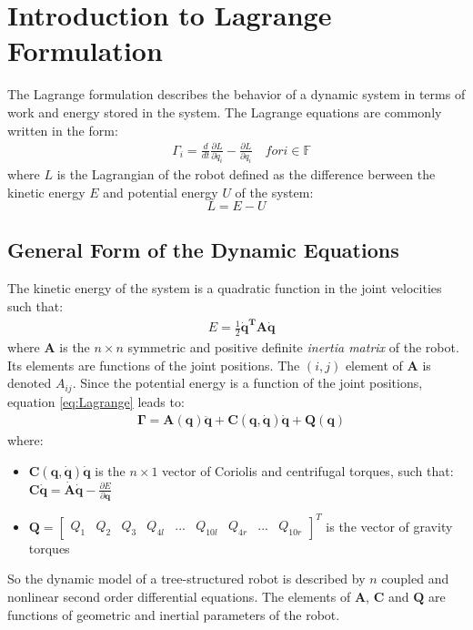 \documentclass[a4paper,10pt]{article}
\begin{document}
\section{Introduction to Lagrange Formulation}
The Lagrange formulation describes the behavior of a dynamic system in terms of work and energy stored in the
system. The Lagrange equations are commonly written in the form:
\begin{align}
 &\Gamma_i = \frac{d}{dt}\frac{\partial L}{\partial \dot{q}_i}-\frac{\partial L}{\partial q_i} \quad for i \in \mathbb{F} \label{eq:Lagrange}
\end{align} where $L$ is the Lagrangian of the robot defined as the difference berween the kinetic energy $E$ and potential 
energy $U$ of the system:
\[
 L = E-U
\]
\subsection{General Form of the Dynamic Equations}
The kinetic energy of the system is a quadratic function in the joint velocities such that:
\begin{align}
 &E = \frac{1}{2}\mathbf{\dot{q}^TA\dot{q}}
\end{align} where $\mathbf{A}$ is the $n\times n$ symmetric and positive definite \textit{inertia matrix} of the robot.
Its elements are functions of the joint positions. The $(i,j)$ element of $\mathbf{A}$ is denoted $A_{ij}$. Since the 
potential energy is a function of the joint positions, equation \ref{eq:Lagrange} leads to:
\begin{align}
 &\mathbf{\Gamma=A(q)\ddot{q}+C(q,\dot{q})\dot{q}+Q(q)}
\end{align} where:
\begin{itemize}
 \item $\mathbf{C(q,\dot{q})\dot{q}}$ is the $n\times 1$ vector of Coriolis and centrifugal torques, such that: 
 $\mathbf{C\dot{q} = \dot{A}\dot{q}}-\frac{\partial E}{\partial \mathbf{q}}$
 \item $\mathbf{Q} = \left[\begin{matrix} Q_1 & Q_2 & Q_3 & Q_{4l} & ... & Q_{10l} & Q_{4r} & ... & Q_{10r} \end{matrix} \right]^T$ 
 is the vector of gravity torques
\end{itemize}
So the dynamic model of a tree-structured robot is described by $n$ coupled and nonlinear second order differential
equations. The elements of $\mathbf{A}$, $\mathbf{C}$ and $\mathbf{Q}$ are functions of geometric and inertial 
parameters of the robot.
\end{document}
